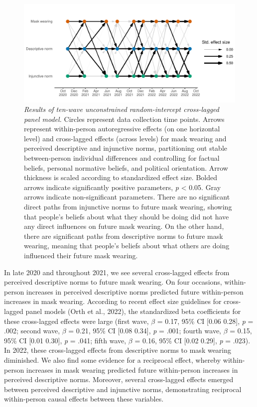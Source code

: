\documentclass[
  man, donotrepeattitle,mask,floatsintext]{apa6}
\begin{document}
\begin{figure}
\centering
\includegraphics{manuscript_files/figure-latex/plotRICLPM-1.pdf}
\caption{\label{fig:plotRICLPM}\emph{Results of ten-wave unconstrained random-intercept cross-lagged panel model.} Circles represent data collection time points. Arrows represent within-person autoregressive effects (on one horizontal level) and cross-lagged effects (across levels) for mask wearing and perceived descriptive and injunctive norms, partitioning out stable between-person individual differences and controlling for factual beliefs, personal normative beliefs, and political orientation. Arrow thickness is scaled according to standardized effect size. Bolded arrows indicate significantly positive parameters, \emph{p} \textless{} 0.05. Gray arrows indicate non-significant parameters. There are no significant direct paths from injunctive norms to future mask wearing, showing that people's beliefs about what they should be doing did not have any direct influences on future mask wearing. On the other hand, there are significant paths from descriptive norms to future mask wearing, meaning that people's beliefs about what others are doing influenced their future mask wearing.}
\end{figure}

In late 2020 and throughout 2021, we see several cross-lagged effects from perceived descriptive norms to future mask wearing. On four occasions, within-person increases in perceived descriptive norms predicted future within-person increases in mask wearing. According to recent effect size guidelines for cross-lagged panel models (Orth et al., 2022), the standardized beta coefficients for these cross-lagged effects were large (first wave, \(\beta\) = 0.17, 95\% CI {[}0.06 0.28{]}, \emph{p} = .002; second wave, \(\beta\) = 0.21, 95\% CI {[}0.08 0.34{]}, \emph{p} = .001; fourth wave, \(\beta\) = 0.15, 95\% CI {[}0.01 0.30{]}, \emph{p} = .041; fifth wave, \(\beta\) = 0.16, 95\% CI {[}0.02 0.29{]}, \emph{p} = .023). In 2022, these cross-lagged effects from descriptive norms to mask wearing diminished. We also find some evidence for a reciprocal effect, whereby within-person increases in mask wearing predicted future within-person increases in perceived descriptive norms. Moreover, several cross-lagged effects emerged between perceived descriptive and injunctive norms, demonstrating reciprocal within-person causal effects between these variables.
\end{document}
